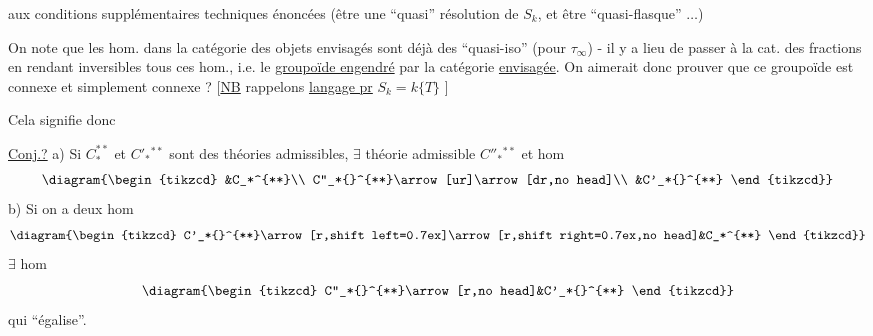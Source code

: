 aux conditions supplémentaires techniques énoncées (être une ``quasi'' résolution de $S_k$, et être ``quasi-flasque'' $\ldots$)

On note que les hom. dans  la catégorie des objets  envisagés sont déjà des ``quasi-iso'' (pour $\tau_\infty$) - il y a lieu de passer à la cat. des fractions en  rendant inversibles tous ces hom., i.e. le \uline{groupoïde engendré} par la catégorie \uline{envisagée}. On aimerait donc prouver que ce groupoïde est connexe et simplement connexe ?
[\uline{NB} rappelons  \uline{langage pr}  $S_k=k\{T\}$ ]

Cela signifie donc

\uline{Conj.?} a) Si $C_*^{**}$ et $C'_*{}^{**}$ sont des théories admissibles, $\exists$ théorie admissible $C''_*{}^{**}$ et hom
\[
\diagram{\begin{tikzcd}
&C_*^{**}\\
C''_*{}^{**}\arrow[ur]\arrow[dr,no head]\\
&C'_*{}^{**}
\end{tikzcd}}
\]
b) Si on a deux hom
\[
\diagram{\begin{tikzcd}
C'_*{}^{**}\arrow[r,shift left=0.7ex]\arrow[r,shift right=0.7ex,no head]&C_*^{**}
\end{tikzcd}}
\]
$\exists$ hom
\[
\diagram{\begin{tikzcd}
C''_*{}^{**}\arrow[r,no head]&C'_*{}^{**}
\end{tikzcd}}
\]
qui ``égalise''.
